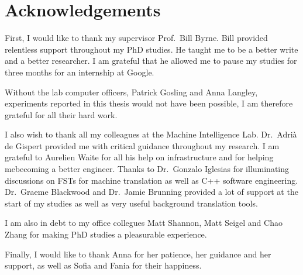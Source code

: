\chapter*{Acknowledgements}

First, I would like to thank my supervisor
Prof.\ Bill Byrne.
Bill provided relentless support throughout
my PhD studies.
He taught me to be a better write and a better researcher.
I am grateful that he allowed
me to pause my studies for three months for
an internship at Google.

Without the lab computer officers, Patrick Gosling
and Anna Langley, experiments reported in this thesis
would not have been possible, I am therefore
grateful for all their hard work.

I also wish to thank all my colleagues at
the Machine Intelligence Lab.
Dr.\ Adrià de Gispert provided me with
critical guidance throughout my research.
I am grateful to Aurelien Waite for all his
help on infrastructure and for helping mebecoming
a better engineer.
Thanks to Dr.\ Gonzalo Iglesias for illuminating
discussions on FSTs for machine translation as well
as C++ software engineering.
Dr.\ Graeme Blackwood and Dr.\ Jamie Brunning
provided a lot of support at the start of my studies as
well as very useful background translation tools.

I am also in debt to my office collegues Matt Shannon, Matt Seigel
and Chao Zhang for making PhD studies a pleasurable experience.

Finally, I would like to thank Anna for her patience, her guidance and
her support, as well as Sofia and Fania for their happiness.
